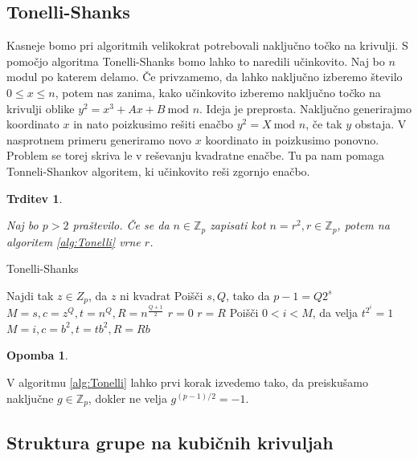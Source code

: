 \documentclass[12pt,a4paper,twoside]{article}
\theoremstyle{definition} %
\newtheorem{opomba}[definicija]{Opomba}
\theoremstyle{plain} %
\newtheorem{trditev}[definicija]{Trditev}
\numberwithin{equation}{section}  %
\newcommand{\Z}{\mathbb Z}
\begin{document}
\subsection{Tonelli-Shanks}
Kasneje bomo pri algoritmih velikokrat potrebovali naključno točko na krivulji. S pomočjo algoritma Tonelli-Shanks bomo lahko to naredili učinkovito. Naj bo $n$ modul po katerem delamo.
Če privzamemo, da lahko naključno izberemo število $0 \leq x \leq n$, potem nas zanima, kako učinkovito izberemo naključno točko na krivulji oblike
$y^2 = x^3 +Ax+B \ \text{mod } n$. Ideja je preprosta. Naključno generirajmo koordinato $x$ in nato poizkusimo rešiti enačbo $y^2 = X \ \text{mod } n$, če tak $y$ obstaja. V nasprotnem primeru generiramo novo $x$ koordinato in poizkusimo ponovno. Problem se torej skriva le v reševanju kvadratne enačbe. Tu pa nam pomaga Tonneli-Shankov algoritem, ki učinkovito reši zgornjo enačbo.

\begin{trditev}~

Naj bo $p > 2$ praštevilo. Če se da $n \in \Z_p$ zapisati kot $n = r^2, r \in \Z_p$, potem na algoritem \ref{alg:Tonelli} vrne $r$.

\end{trditev}

\begin{algorithm}[H]
\caption[Tonelli]{Tonelli-Shanks}
\label{alg:Tonelli}

\begin{algorithmic}
\State Najdi tak $z \in Z_p$, da $z$ ni kvadrat
\State Poišči $s,Q$, tako da $p-1 = Q2^s$
\State $M = s,c = z^Q,t = n^Q,R=n^{\frac{Q+1}{2}}$
		\State \Return $r=0$
		\State \Return $r=R$
	\Else
		\State Poišči $0<i<M$, da velja $t^{2^i} = 1$
		\State  $M = i,c = b^2,t = tb^2,R=Rb$
	\EndIf
\EndWhile

\end{algorithmic}
\end{algorithm}

\begin{opomba}~

V algoritmu \ref{alg:Tonelli} lahko prvi korak izvedemo tako, da preiskušamo naključne $g\in \Z_p$, dokler ne velja $g^{(p-1)/2} = -1$.
\end{opomba}


\subsection{Struktura grupe na kubičnih krivuljah}
\end{document}
